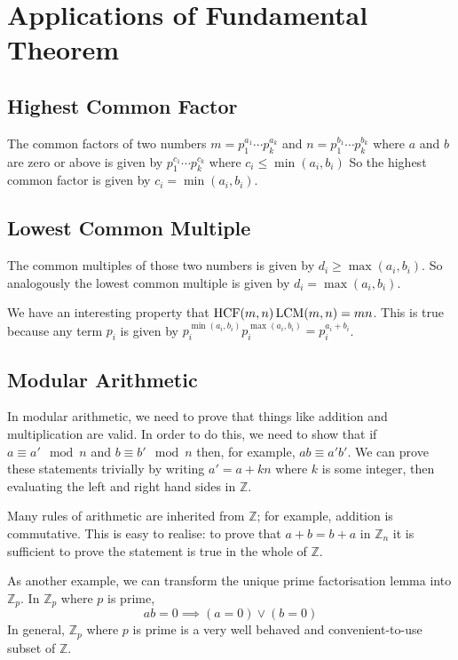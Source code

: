 \documentclass{article}
\begin{document}
	\section{Applications of Fundamental Theorem}
	\subsection{Highest Common Factor}
	The common factors of two numbers $m = p_1^{a_1} \cdots p_k^{a_k}$ and $n = p_1^{b_1} \cdots p_k^{b_k}$ where $a$ and $b$ are zero or above is given by $p_1^{c_1} \cdots p_k^{c_k}$ where $c_i \leq \min(a_i, b_i)$ So the highest common factor is given by $c_i = \min(a_i, b_i)$.
	
	\subsection{Lowest Common Multiple}
	The common multiples of those two numbers is given by $d_i \geq \max(a_i, b_i)$. So analogously the lowest common multiple is given by $d_i = \max(a_i, b_i)$.
	
	We have an interesting property that $\operatorname{HCF}(m, n) \operatorname{LCM}(m, n) = mn$. This is true because any term $p_i$ is given by $p_i^{\min(a_i, b_i)}p_i^{\max(a_i, b_i)} = p_i^{a_i + b_i}$.
	
	\subsection{Modular Arithmetic}
	In modular arithmetic, we need to prove that things like addition and multiplication are valid. In order to do this, we need to show that if $a \equiv a' \mod n$ and $b \equiv b' \mod n$ then, for example, $ab \equiv a'b'$. We can prove these statements trivially by writing $a' = a + kn$ where $k$ is some integer, then evaluating the left and right hand sides in $\mathbb Z$.
	
	Many rules of arithmetic are inherited from $\mathbb Z$; for example, addition is commutative. This is easy to realise: to prove that $a + b = b + a$ in $\mathbb Z_n$ it is sufficient to prove the statement is true in the whole of $\mathbb Z$.
	
	As another example, we can transform the unique prime factorisation lemma into $\mathbb Z_p$. In $\mathbb Z_p$ where $p$ is prime,
	\[ ab = 0 \implies (a = 0) \vee (b = 0) \]
	In general, $\mathbb Z_p$ where $p$ is prime is a very well behaved and convenient-to-use subset of $\mathbb Z$.
	
\end{document}
